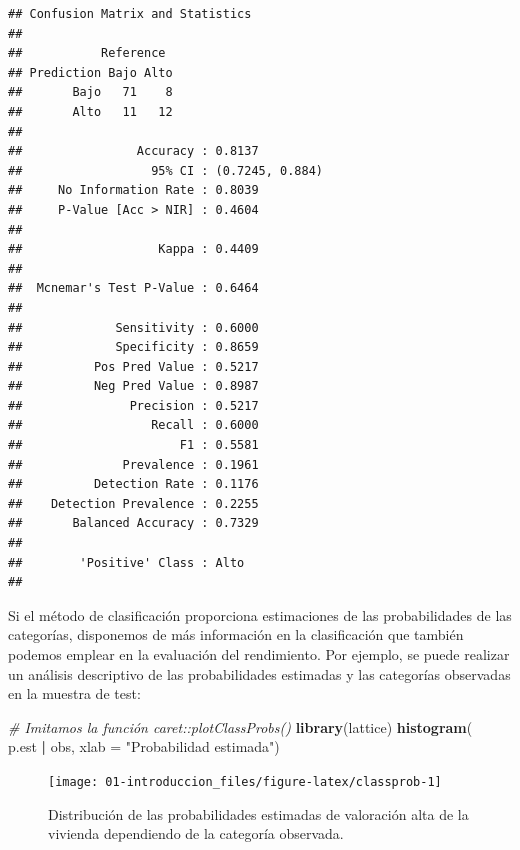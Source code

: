 \documentclass[
  spanish,
]{book}
\newenvironment{Shaded}{\begin{snugshade}}{\end{snugshade}}
\newcommand{\CommentTok}[1]{\textcolor[rgb]{0.56,0.35,0.01}{\textit{#1}}}
\newcommand{\DataTypeTok}[1]{\textcolor[rgb]{0.13,0.29,0.53}{#1}}
\newcommand{\KeywordTok}[1]{\textcolor[rgb]{0.13,0.29,0.53}{\textbf{#1}}}
\newcommand{\NormalTok}[1]{#1}
\newcommand{\OperatorTok}[1]{\textcolor[rgb]{0.81,0.36,0.00}{\textbf{#1}}}
\newcommand{\StringTok}[1]{\textcolor[rgb]{0.31,0.60,0.02}{#1}}
\theoremstyle{break}
\theoremstyle{definition}
\theoremstyle{definition}
\theoremstyle{definition}
\theoremstyle{remark}
\begin{document}
\begin{verbatim}
## Confusion Matrix and Statistics
## 
##           Reference
## Prediction Bajo Alto
##       Bajo   71    8
##       Alto   11   12
##                                          
##                Accuracy : 0.8137         
##                  95% CI : (0.7245, 0.884)
##     No Information Rate : 0.8039         
##     P-Value [Acc > NIR] : 0.4604         
##                                          
##                   Kappa : 0.4409         
##                                          
##  Mcnemar's Test P-Value : 0.6464         
##                                          
##             Sensitivity : 0.6000         
##             Specificity : 0.8659         
##          Pos Pred Value : 0.5217         
##          Neg Pred Value : 0.8987         
##               Precision : 0.5217         
##                  Recall : 0.6000         
##                      F1 : 0.5581         
##              Prevalence : 0.1961         
##          Detection Rate : 0.1176         
##    Detection Prevalence : 0.2255         
##       Balanced Accuracy : 0.7329         
##                                          
##        'Positive' Class : Alto           
## 
\end{verbatim}

Si el método de clasificación proporciona estimaciones de las probabilidades de las categorías, disponemos de más información en la clasificación que también podemos emplear en la evaluación del rendimiento.
Por ejemplo, se puede realizar un análisis descriptivo de las probabilidades estimadas y las categorías observadas en la muestra de test:

\begin{Shaded}
\begin{Highlighting}[]
\CommentTok{# Imitamos la función caret::plotClassProbs()}
\KeywordTok{library}\NormalTok{(lattice) }
\KeywordTok{histogram}\NormalTok{(}\OperatorTok{~}\StringTok{ }\NormalTok{p.est }\OperatorTok{|}\StringTok{ }\NormalTok{obs, }\DataTypeTok{xlab =} \StringTok{"Probabilidad estimada"}\NormalTok{)}
\end{Highlighting}
\end{Shaded}

\begin{figure}[!htb]

{\centering \texttt{[image: 01-introduccion\_files/figure-latex/classprob-1]} 

}

\caption{Distribución de las probabilidades estimadas de valoración alta de la vivienda dependiendo de la categoría observada.}\label{fig:classprob}
\end{figure}
\end{document}

